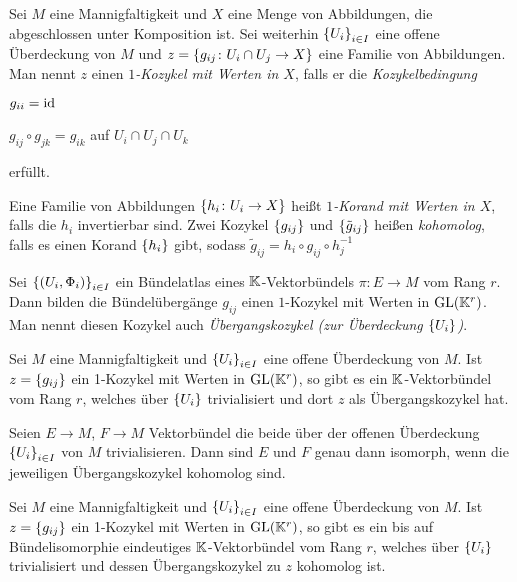 \begin{definition}
  Sei $M$ eine Mannigfaltigkeit und $X$ eine Menge von Abbildungen,
  die abgeschlossen unter Komposition ist.
  Sei weiterhin $\left\lbrace U_i \right\rbrace_{i\in I}$ eine offene
  Überdeckung von $M$ und $z = \left\lbrace  g_{ij} \colon U_i\cap U_j \to X \right\rbrace$
  eine Familie von Abbildungen. Man nennt $z$ einen
  \emph{$1$-Kozykel mit Werten in $X$}, falls er die \emph{Kozykelbedingung}
  \begin{statements}
  \item $g_{ii} = \operatorname{id}$
  \item $g_{ij} \circ g_{jk} = g_{ik}$ auf $U_i\cap U_j\cap U_k$
  \end{statements}
  erfüllt.

  Eine Familie von Abbildungen $\left\lbrace h_i\colon U_i \to X \right\rbrace$ heißt
  \emph{$1$-Korand mit Werten in $X$}, falls die $h_i$ invertierbar
  sind. Zwei Kozykel $\left\lbrace g_{ij} \right\rbrace$ und
  $\left\lbrace \tilde{g}_{ij} \right\rbrace$ heißen \emph{kohomolog}, falls es einen
  Korand $\left\lbrace h_i \right\rbrace$ gibt, sodass $\tilde{g}_{ij} = h_i \circ g_{ij}
  \circ h_j^{-1}$ 
\end{definition}

\begin{proposition}
  Sei $\left\lbrace (U_i,\Phi_i) \right\rbrace_{i\in I}$ ein Bündelatlas eines $\mathbb{K}$-Vektorbündels
  $\pi\colon E \to M$ vom Rang $r$. Dann bilden die Bündelübergänge $g_{ij}$ einen
  $1$-Kozykel mit Werten in $\operatorname{GL}(\mathbb{K}^r)$. Man nennt diesen Kozykel auch
  \emph{Übergangskozykel (zur Überdeckung $\left\lbrace U_i \right\rbrace$)}.
\end{proposition}

\begin{proposition}
  Sei $M$ eine Mannigfaltigkeit und $\left\lbrace U_i \right\rbrace_{i\in I}$ eine offene
  Überdeckung von $M$. Ist $z = \left\lbrace g_{ij} \right\rbrace$ ein 1-Kozykel mit Werten
  in $\operatorname{GL}(\mathbb{K}^r)$, so gibt es ein $\mathbb{K}$-Vektorbündel vom Rang $r$,
  welches über $\left\lbrace U_i \right\rbrace$ trivialisiert und dort $z$ als
  Übergangskozykel hat.
\end{proposition}

\begin{proposition}
  Seien $E\to M$, $F\to M$ Vektorbündel die beide über der offenen
  Überdeckung $\left\lbrace U_i \right\rbrace_{i\in I}$ von $M$ trivialisieren. Dann sind $E$ und $F$ genau
  dann isomorph, wenn die jeweiligen Übergangskozykel kohomolog sind.
\end{proposition}

\begin{satz}
  Sei $M$ eine Mannigfaltigkeit und $\left\lbrace U_i \right\rbrace_{i\in I}$ eine offene
  Überdeckung von $M$. Ist $z = \left\lbrace g_{ij} \right\rbrace$ ein 1-Kozykel mit Werten
  in $\operatorname{GL}(\mathbb{K}^r)$, so gibt es ein bis auf Bündelisomorphie eindeutiges $\mathbb{K}$-Vektorbündel vom Rang $r$,
  welches über $\left\lbrace U_i \right\rbrace$ trivialisiert und dessen Übergangskozykel
  zu $z$ kohomolog ist.
\end{satz}


